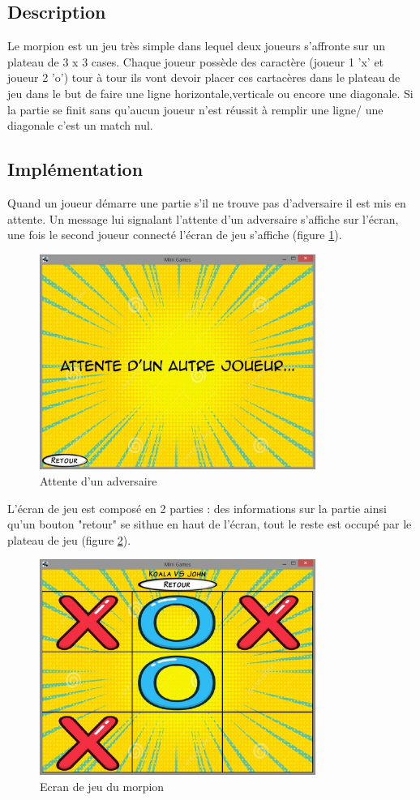 \documentclass{report}
\begin{document}
\subsection{Description}
Le morpion est un jeu très simple dans lequel deux joueurs s'affronte sur un plateau de 3 x 3 cases. Chaque joueur possède des caractère (joueur 1 'x' et joueur 2 'o')
tour à tour ils vont devoir placer ces cartacères dans le plateau de jeu dans le but de faire une ligne horizontale,verticale ou encore une diagonale.
Si la partie se finit sans qu'aucun joueur n'est réussit à remplir une ligne/ une diagonale c'est un match nul.
\subsection{Implémentation}

Quand un joueur démarre une partie s'il ne trouve pas d'adversaire il est mis en attente. Un message lui signalant l'attente d'un
adversaire s'affiche sur l'écran, une fois le second joueur connecté l'écran de jeu s'affiche (figure \ref{attente_adversaire}).

\begin{figure}[H]
	\centering\includegraphics[width=9cm]{morpionwaiting}
	\caption{Attente d'un adversaire}
  \label{attente_adversaire}
\end{figure}

L'écran de jeu est composé en 2 parties : des informations sur la partie ainsi qu'un bouton "retour" se sithue en haut
de l'écran, tout le reste est occupé par le plateau de jeu (figure \ref{morpion_en_jeu}).

\begin{figure}[H]
	\centering\includegraphics[width=9cm]{morpioningame}
	\caption{Ecran de jeu du morpion}
  \label{morpion_en_jeu}
\end{figure}
\end{document}
